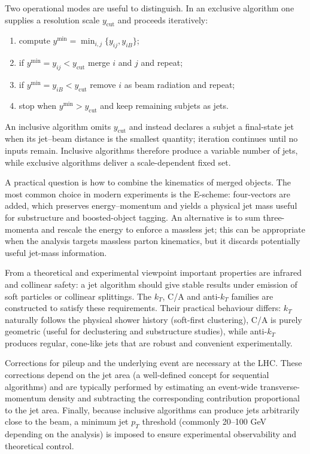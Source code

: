 Two operational modes are useful to distinguish. In an exclusive algorithm one supplies a resolution scale \(y_{\text{cut}}\) and proceeds iteratively:
\begin{enumerate}
  \item compute \(y^{\min}=\min_{i,j}\{y_{ij},y_{iB}\}\);
  \item if \(y^{\min}=y_{ij}<y_{\text{cut}}\) merge \(i\) and \(j\) and repeat;
  \item if \(y^{\min}=y_{iB}<y_{\text{cut}}\) remove \(i\) as beam radiation and repeat;
  \item stop when \(y^{\min}>y_{\text{cut}}\) and keep remaining subjets as jets.
\end{enumerate}
An inclusive algorithm omits \(y_{\text{cut}}\) and instead declares a subjet a final-state jet when its jet–beam distance is the smallest quantity; iteration continues until no inputs remain. Inclusive algorithms therefore produce a variable number of jets, while exclusive algorithms deliver a scale-dependent fixed set.

A practical question is how to combine the kinematics of merged objects. The most common choice in modern experiments is the E-scheme: four-vectors are added, which preserves energy–momentum and yields a physical jet mass useful for substructure and boosted-object tagging. An alternative is to sum three-momenta and rescale the energy to enforce a massless jet; this can be appropriate when the analysis targets massless parton kinematics, but it discards potentially useful jet-mass information.

From a theoretical and experimental viewpoint important properties are infrared and collinear safety: a jet algorithm should give stable results under emission of soft particles or collinear splittings. The \(k_T\), C/A and anti-\(k_T\) families are constructed to satisfy these requirements. Their practical behaviour differs: \(k_T\) naturally follows the physical shower history (soft-first clustering), C/A is purely geometric (useful for declustering and substructure studies), while anti-\(k_T\) produces regular, cone-like jets that are robust and convenient experimentally.

Corrections for pileup and the underlying event are necessary at the LHC. These corrections depend on the jet area (a well-defined concept for sequential algorithms) and are typically performed by estimating an event-wide transverse-momentum density and subtracting the corresponding contribution proportional to the jet area. Finally, because inclusive algorithms can produce jets arbitrarily close to the beam, a minimum jet \(p_T\) threshold (commonly 20–100 GeV depending on the analysis) is imposed to ensure experimental observability and theoretical control.

